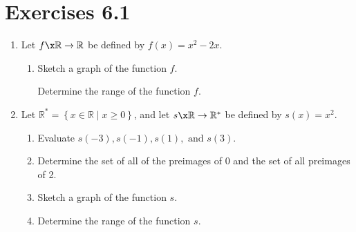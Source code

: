 \section*{Exercises 6.1}
%
\begin{enumerate}
\item Let  $f\x \mathbb{R} \to \mathbb{R}$ be defined by  $f\left( x \right) = x^2  - 2x$.
\begin{enumerate} \label{exer:sec61-2}
  \yitem Evaluate  $f( { - 3} ), f( { - 1} ), f( 1 ), \text{ and }f( 3 )$.

  \yitem Determine the set of all of the preimages of  0 and the set of all of the preimages of 4.


  \item Sketch a graph of the function  $f$\!.

  \yitem Determine the range of the function  $f$\!.
\end{enumerate}

\item Let  
$\mathbb{R}^*  = \left\{ { {x \in \mathbb{R}} \mid x \geq 0} \right\}$, and let  
$s\x \mathbb{R} \to \mathbb{R}^* $ be defined by  $s( x ) = x^2 $.

\begin{enumerate}
  \item Evaluate  $s( { - 3} ), s( { - 1} ), s( 1 ), \text{ and }s( 3 )$.

  \item Determine the set of all of the preimages of  0 and the set of all preimages of 2.

  \item Sketch a graph of the function  $s$.

  \item Determine the range of the function  $s$.

\end{enumerate}


\end{enumerate}
